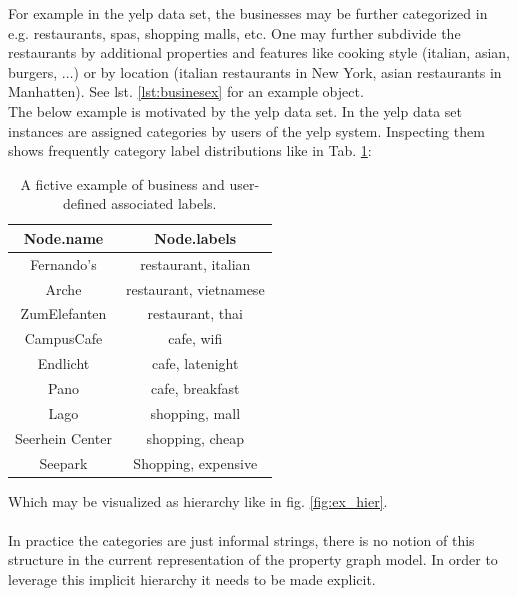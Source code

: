 For example in the yelp data set, the businesses may be further categorized in e.g. restaurants, spas, shopping malls, etc. One may further subdivide the restaurants by additional properties and features like cooking style (italian, asian, burgers, $\dots$) or  by location (italian restaurants in New York, asian restaurants in Manhatten). See lst. \ref{lst:businesex} for an example object. \\
The below example is motivated by the yelp data set. In the yelp data set instances are assigned categories by users of the yelp system. Inspecting them shows frequently category label distributions like in Tab. \ref{tab:running_ex}: \\
\begin{table}[htp]
     \centering
     \begin{tabular}{c c} \toprule
            Node.name & Node.labels \\ \midrule
            Fernando's & restaurant, italian \\ 
            Arche & restaurant, vietnamese \\ 
            ZumElefanten & restaurant, thai \\ 
            CampusCafe & cafe, wifi \\ 
            Endlicht & cafe, latenight \\ 
            Pano & cafe, breakfast \\
            Lago & shopping, mall \\ 
            Seerhein Center & shopping, cheap \\ 
            Seepark & Shopping, expensive \\ \bottomrule
        \end{tabular}
    \caption{A fictive example of business and user-defined associated labels.}
    \label{tab:running_ex}
\end{table}{}
Which may be visualized as hierarchy like in fig. \ref{fig:ex_hier}. \\
 \\
 In practice the categories are just informal strings, there is no notion of this structure in the current representation of the property graph model. In order to leverage this implicit hierarchy it needs to be made explicit. \\
 
